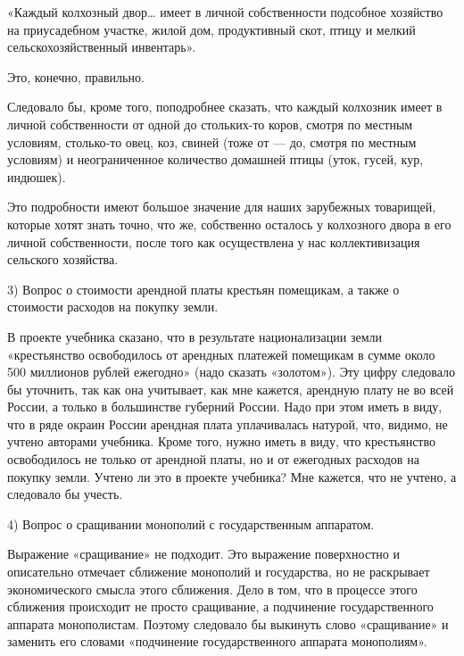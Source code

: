 \documentclass[12pt, a4paper, openany]{book}
\begin{document}
«Каждый колхозный двор… имеет в личной собственности подсобное хозяйство на приусадебном участке, жилой дом, продуктивный скот, птицу и мелкий сельскохозяйственный инвентарь».



Это, конечно, правильно.



Следовало бы, кроме того, поподробнее сказать, что каждый колхозник имеет в личной собственности от одной до стольких-то коров, смотря по местным условиям, столько-то овец, коз, свиней (тоже от — до, смотря по местным условиям) и неограниченное количество домашней птицы (уток, гусей, кур, индюшек).



Это подробности имеют большое значение для наших зарубежных товарищей, которые хотят знать точно, что же, собственно осталось у колхозного двора в его личной собственности, после того как осуществлена у нас коллективизация сельского хозяйства.



3) Вопрос о стоимости арендной платы крестьян помещикам, а также о стоимости расходов на покупку земли.



В проекте учебника сказано, что в результате национализации земли «крестьянство освободилось от арендных платежей помещикам в сумме около 500 миллионов рублей ежегодно» (надо сказать «золотом»). Эту цифру следовало бы уточнить, так как она учитывает, как мне кажется, арендную плату не во всей России, а только в большинстве губерний России. Надо при этом иметь в виду, что в ряде окраин России арендная плата уплачивалась натурой, что, видимо, не учтено авторами учебника. Кроме того, нужно иметь в виду, что крестьянство освободилось не только от арендной платы, но и от ежегодных расходов на покупку земли. Учтено ли это в проекте учебника? Мне кажется, что не учтено, а следовало бы учесть.



4) Вопрос о сращивании монополий с государственным аппаратом.



Выражение «сращивание» не подходит. Это выражение поверхностно и описательно отмечает сближение монополий и государства, но не раскрывает экономического смысла этого сближения. Дело в том, что в процессе этого сближения происходит не просто сращивание, а подчинение государственного аппарата монополистам. Поэтому следовало бы выкинуть слово «сращивание» и заменить его словами «подчинение государственного аппарата монополиям».
\end{document}
